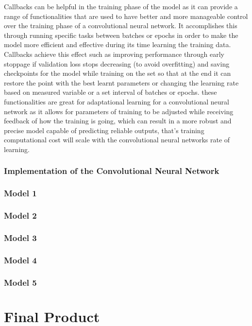 \documentclass[]{final_report}
\begin{document}
Callbacks can be helpful in the training phase of the model as it can provide a range of functionalities that are used to have better and more manageable control over the training phase of a convolutional neural network. It accomplishes this through running specific tasks between batches or epochs in order to make the model more efficient and effective during its time learning the training data. Callbacks achieve this effect such as improving performance through early stoppage if validation loss stops decreasing (to avoid overfitting) and saving checkpoints for the model while training on the set so that at the end it can restore the point with the best learnt parameters or changing the learning rate based on measured variable or a set interval of batches or epochs. these functionalities are great for adaptational learning for a convolutional neural network as it allows for parameters of training to be adjusted while receiving feedback of how the training is going, which can result in a more robust and precise model capable of predicting reliable outputs, that's training computational cost will scale with the convolutional neural networks rate of learning. 

\subsection{Implementation of the Convolutional Neural Network}



\subsection{Model 1}
\subsection{Model 2}
\subsection{Model 3}
\subsection{Model 4}
\subsection{Model 5}

\chapter{Final Product}
\end{document}
